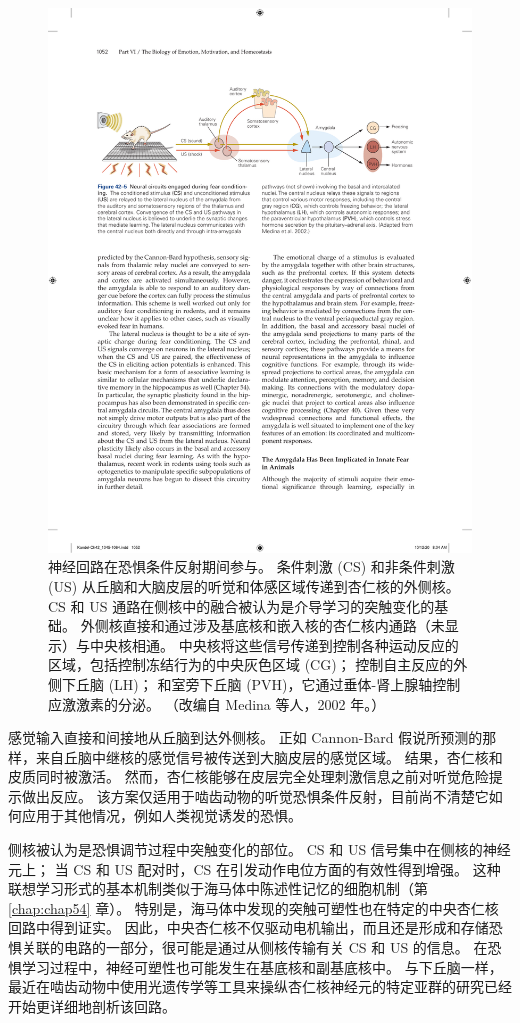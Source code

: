\begin{figure}[htbp]
	\centering
	\includegraphics[width=0.95\linewidth]{chap42/fig_42_5}
	\caption{神经回路在恐惧条件反射期间参与。 条件刺激 (CS) 和非条件刺激 (US) 从丘脑和大脑皮层的听觉和体感区域传递到杏仁核的外侧核。 CS 和 US 通路在侧核中的融合被认为是介导学习的突触变化的基础。 外侧核直接和通过涉及基底核和嵌入核的杏仁核内通路（未显示）与中央核相通。 中央核将这些信号传递到控制各种运动反应的区域，包括控制冻结行为的中央灰色区域 (CG)； 控制自主反应的外侧下丘脑 (LH)； 和室旁下丘脑 (PVH)，它通过垂体-肾上腺轴控制应激激素的分泌。 （改编自 Medina 等人，2002 年。）}
	\label{fig:42_5}
\end{figure}

感觉输入直接和间接地从丘脑到达外侧核。 正如 Cannon-Bard 假说所预测的那样，来自丘脑中继核的感觉信号被传送到大脑皮层的感觉区域。 结果，杏仁核和皮质同时被激活。 然而，杏仁核能够在皮层完全处理刺激信息之前对听觉危险提示做出反应。 该方案仅适用于啮齿动物的听觉恐惧条件反射，目前尚不清楚它如何应用于其他情况，例如人类视觉诱发的恐惧。

侧核被认为是恐惧调节过程中突触变化的部位。 CS 和 US 信号集中在侧核的神经元上； 当 CS 和 US 配对时，CS 在引发动作电位方面的有效性得到增强。 这种联想学习形式的基本机制类似于海马体中陈述性记忆的细胞机制（第 \ref{chap:chap54} 章）。 特别是，海马体中发现的突触可塑性也在特定的中央杏仁核回路中得到证实。 因此，中央杏仁核不仅驱动电机输出，而且还是形成和存储恐惧关联的电路的一部分，很可能是通过从侧核传输有关 CS 和 US 的信息。 在恐惧学习过程中，神经可塑性也可能发生在基底核和副基底核中。 与下丘脑一样，最近在啮齿动物中使用光遗传学等工具来操纵杏仁核神经元的特定亚群的研究已经开始更详细地剖析该回路。

